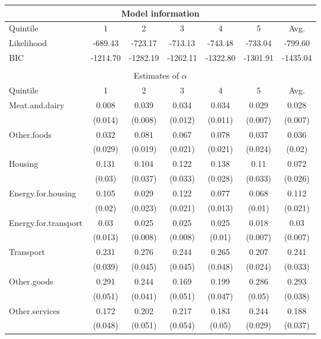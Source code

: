 \begin{tabular}{lcccccc}
  \multicolumn{7}{c}{Model information} \\\hline
Quintile & 1 & 2 & 3 & 4 & 5 & Avg. \\ 
  \hline
Likelihood & -689.43 & -723.17 & -713.13 & -743.48 & -733.04 & -799.60 \\ 
  BIC & -1214.70 & -1282.19 & -1262.11 & -1322.80 & -1301.91 & -1435.04 \\ 
   \hline \\
\multicolumn{7}{c}{Estimates of $\alpha$} \\ 
  \hline
 Quintile & 1 & 2 & 3 & 4 & 5 & Avg. \\ 
  \hline
Meat.and.dairy & 0.008 & 0.039 & 0.034 & 0.034 & 0.029 & 0.028 \\ 
 & (0.014) & (0.008) & (0.012) & (0.011) & (0.007) & (0.007) \\ 
  Other.foods & 0.032 & 0.081 & 0.067 & 0.078 & 0.037 & 0.036 \\ 
   & (0.029) & (0.019) & (0.021) & (0.021) & (0.024) & (0.02) \\ 
  Housing & 0.131 & 0.104 & 0.122 & 0.138 & 0.11 & 0.072 \\ 
   & (0.03) & (0.037) & (0.033) & (0.028) & (0.033) & (0.026) \\ 
  Energy.for.housing & 0.105 & 0.029 & 0.122 & 0.077 & 0.068 & 0.112 \\ 
  & (0.02) & (0.023) & (0.021) & (0.013) & (0.01) & (0.021) \\ 
  Energy.for.transport & 0.03 & 0.025 & 0.025 & 0.025 & 0.018 & 0.03 \\ 
   & (0.013) & (0.008) & (0.008) & (0.01) & (0.007) & (0.007) \\ 
  Transport & 0.231 & 0.276 & 0.244 & 0.265 & 0.207 & 0.241 \\ 
   & (0.039) & (0.045) & (0.045) & (0.048) & (0.024) & (0.033) \\ 
  Other.goods & 0.291 & 0.244 & 0.169 & 0.199 & 0.286 & 0.293 \\ 
& (0.051) & (0.041) & (0.051) & (0.047) & (0.05) & (0.038) \\ 
  Other.services & 0.172 & 0.202 & 0.217 & 0.183 & 0.244 & 0.188 \\ 
 & (0.048) & (0.051) & (0.054) & (0.05) & (0.029) & (0.037) \\ \hline

\end{tabular}

